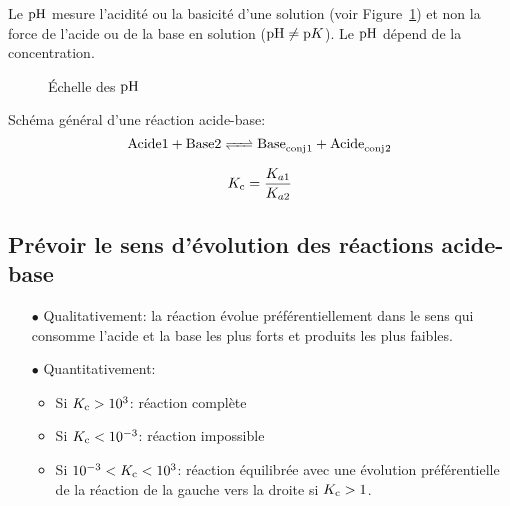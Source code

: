 Le $\mathrm{pH}$ mesure l'acidité ou la basicité d'une solution (voir Figure~\ref{fig:ph_scale}) et non la force de l'acide ou de la base en solution ($\mathrm{pH} \neq \mathrm{p}K$).
Le $\mathrm{pH}$ dépend de la concentration.
\begin{figure}[ht!]
	\begin{center}
	\end{center}
	\caption{Échelle des $\mathrm{pH}$}
	\label{fig:ph_scale}
\end{figure}

Schéma général d'une réaction acide-base:
\[ \ce{Acide 1 + Base 2 <=> Base_{conj}1 + Acide_{conj}2} \]

$$K_{\mathrm{c}}=\frac{K_{a1}}{K_{a2}}$$

\subsection{Prévoir le sens d'évolution des réactions acide-base}

\begin{itemize}
\item[$\bullet$] Qualitativement: la réaction évolue préférentiellement dans le sens qui consomme l'acide et la base les plus forts et produits les plus faibles.
\item[$\bullet$] Quantitativement:
	\begin{itemize}
	\item Si $K_{\mathrm{c}}>10^3$: réaction complète
	\item Si $K_{\mathrm{c}}<10^{-3}$: réaction impossible
	\item Si $10^{-3}<K_{\mathrm{c}}<10^3$: réaction équilibrée avec une évolution préférentielle de la réaction de la gauche vers la droite si $K_{\mathrm{c}}>1$.
	\end{itemize}
\end{itemize}

